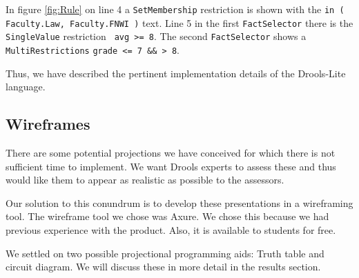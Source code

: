 In figure \ref{fig:Rule} on line 4 a \texttt{SetMembership} restriction is shown with the \texttt{in ( Faculty.Law, Faculty.FNWI )} text.
Line 5 in the first \texttt{FactSelector} there is the \texttt{SingleValue} restriction \texttt{ avg >= 8}.
The second \texttt{FactSelector} shows a \texttt{MultiRestrictions} \texttt{grade <= 7 \&\& > 8}.

Thus, we have described the pertinent implementation details of the Drools-Lite language.

\subsection{Wireframes}

There are some potential projections we have conceived for which there is not sufficient time to implement.
We want Drools experts to assess these and thus would like them to appear as realistic as possible to the assessors.

Our solution to this conundrum is to develop these presentations in a wireframing tool.
The wireframe tool we chose was Axure\cite{Axure_ProductPage}.
We chose this because we had previous experience with the product.
Also, it is available to students for free.

We settled on two possible projectional programming aids: Truth table and circuit diagram.
We will discuss these in more detail in the results section.

